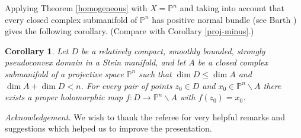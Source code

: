 \documentclass[11pt]{amsart}
\numberwithin{equation}{section}
\newtheorem{corollary}[theorem]{Corollary}
\theoremstyle{definition}
\begin{document}
 

Applying Theorem \ref{homogeneous} with $X={\mathbb{P}}^n$
and taking into account that every closed complex
submanifold of ${\mathbb{P}}^n$ has positive normal bundle
(see Barth \cite{Barth}) gives the following corollary. 
(Compare with Corollary \ref{proj-minus}.)

\begin{corollary}
\label{projective}
Let $D$ be a relatively compact, smoothly bounded, 
strongly pseudoconvex domain in a Stein manifold,
and let $A$ be a closed complex submanifold of a projective space ${\mathbb{P}}^n$
such that $\dim D\le \dim A$ and $\dim A + \dim D < n$.  
For every pair of points $z_0\in D$ and $x_0\in {\mathbb{P}}^n {\backslash} A$ there exists
a proper holomorphic map $f\colon D \to {\mathbb{P}}^n{\backslash} A$ with $f(z_0)=x_0$.
\end{corollary}

 
 

\medskip
\textit{Acknowledgement.}
We wish to thank  the referee for very helpful remarks
and suggestions which helped us to improve the presentation.
\end{document}
